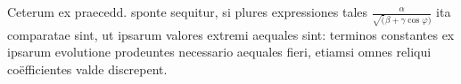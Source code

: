 Ceterum ex praecedd. sponte sequitur, si plures expressiones tales
$\frac{\alpha}{\surd(\beta+\gamma\cos\varphi)}$ ita comparatae sint, ut ipsarum
valores extremi aequales sint: terminos constantes ex ipsarum evolutione prodeuntes necessario aequales fieri, etiamsi omnes reliqui coëfficientes valde discrepent.